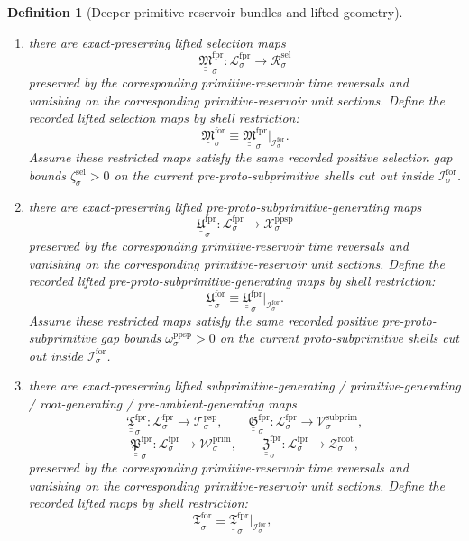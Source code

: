 \documentclass[11pt]{article}
\newcommand{\RootTarget}[1]{\mathcal Z_{#1}^{\mathrm{root}}}
\newcommand{\PrimTarget}[1]{\mathcal W_{#1}^{\mathrm{prim}}}
\newcommand{\SubprimTarget}[1]{\mathcal V_{#1}^{\mathrm{subprim}}}
\newcommand{\ProtoSubprimTarget}[1]{\mathcal T_{#1}^{\mathrm{psp}}}
\newcommand{\PreProtoSubprimTarget}[1]{\mathcal X_{#1}^{\mathrm{ppsp}}}
\newcommand{\PreProtoSubprimGap}[1]{\omega_{#1}^{\mathrm{ppsp}}}
\newcommand{\SelTarget}[1]{\mathcal R_{#1}^{\mathrm{sel}}}
\newcommand{\SelGap}[1]{\zeta_{#1}^{\mathrm{sel}}}
\newcommand{\ForSpace}[1]{\mathcal I_{#1}^{\mathrm{for}}}
\newcommand{\ForLiftedSelection}[1]{\underline{\mathfrak M}_{#1}^{\mathrm{for}}}
\newcommand{\ForLiftedPreProto}[1]{\underline{\mathfrak U}_{#1}^{\mathrm{for}}}
\newcommand{\ForLiftedSubprimitive}[1]{\underline{\mathfrak T}_{#1}^{\mathrm{for}}}
\newcommand{\ForPrimSpace}[1]{\mathcal L_{#1}^{\mathrm{fpr}}}
\newcommand{\ForPrimLiftedSelection}[1]{\underline{\underline{\mathfrak M}}_{#1}^{\mathrm{fpr}}}
\newcommand{\ForPrimLiftedPreProto}[1]{\underline{\underline{\mathfrak U}}_{#1}^{\mathrm{fpr}}}
\newcommand{\ForPrimLiftedSubprimitive}[1]{\underline{\underline{\mathfrak T}}_{#1}^{\mathrm{fpr}}}
\newcommand{\ForPrimLiftedPrimitive}[1]{\underline{\underline{\mathfrak G}}_{#1}^{\mathrm{fpr}}}
\newcommand{\ForPrimLiftedRoot}[1]{\underline{\underline{\mathfrak P}}_{#1}^{\mathrm{fpr}}}
\newcommand{\ForPrimLiftedPreAmbient}[1]{\underline{\underline{\mathfrak Z}}_{#1}^{\mathrm{fpr}}}
\newtheorem{definition}{Definition}
\begin{document}
\begin{definition}[Deeper primitive-reservoir bundles and lifted geometry]
\begin{enumerate}
    \item there are exact-preserving lifted selection maps
    \[
    \ForPrimLiftedSelection{\sigma}:\ForPrimSpace{\sigma}\to\SelTarget{\sigma}
    \]
    preserved by the corresponding primitive-reservoir time reversals and vanishing on the corresponding primitive-reservoir unit sections. Define the recorded lifted selection maps by shell restriction:
    \begin{equation}
    \ForLiftedSelection{\sigma}\equiv \ForPrimLiftedSelection{\sigma}|_{\ForSpace{\sigma}}.
    \label{eq:forcing_selection_from_reservoir}
    \end{equation}
    Assume these restricted maps satisfy the same recorded positive selection gap bounds \(\SelGap{\sigma}>0\) on the current pre-proto-subprimitive shells cut out inside \(\ForSpace{\sigma}\).
    \item there are exact-preserving lifted pre-proto-subprimitive-generating maps
    \[
    \ForPrimLiftedPreProto{\sigma}:\ForPrimSpace{\sigma}\to\PreProtoSubprimTarget{\sigma}
    \]
    preserved by the corresponding primitive-reservoir time reversals and vanishing on the corresponding primitive-reservoir unit sections. Define the recorded lifted pre-proto-subprimitive-generating maps by shell restriction:
    \begin{equation}
    \ForLiftedPreProto{\sigma}\equiv \ForPrimLiftedPreProto{\sigma}|_{\ForSpace{\sigma}}.
    \label{eq:forcing_preproto_from_reservoir}
    \end{equation}
    Assume these restricted maps satisfy the same recorded positive pre-proto-subprimitive gap bounds \(\PreProtoSubprimGap{\sigma}>0\) on the current proto-subprimitive shells cut out inside \(\ForSpace{\sigma}\).
    \item there are exact-preserving lifted subprimitive-generating / primitive-generating / root-generating / pre-ambient-generating maps
    \[
    \ForPrimLiftedSubprimitive{\sigma}:\ForPrimSpace{\sigma}\to\ProtoSubprimTarget{\sigma},\qquad
    \ForPrimLiftedPrimitive{\sigma}:\ForPrimSpace{\sigma}\to\SubprimTarget{\sigma},
    \]
    \[
    \ForPrimLiftedRoot{\sigma}:\ForPrimSpace{\sigma}\to\PrimTarget{\sigma},\qquad
    \ForPrimLiftedPreAmbient{\sigma}:\ForPrimSpace{\sigma}\to\RootTarget{\sigma},
    \]
    preserved by the corresponding primitive-reservoir time reversals and vanishing on the corresponding primitive-reservoir unit sections. Define the recorded lifted maps by shell restriction:
    \begin{equation}
    \ForLiftedSubprimitive{\sigma}\equiv \ForPrimLiftedSubprimitive{\sigma}|_{\ForSpace{\sigma}},\qquad

\end{equation}
\end{enumerate}
\end{definition}
\end{document}
